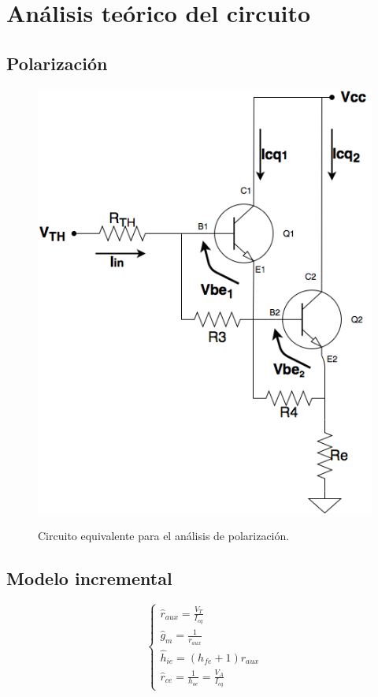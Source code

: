 \section{An\'alisis te\'orico del circuito}

	\subsection{Polarizaci\'on}
		
		\begin{figure}[H]
			\centering
			\includegraphics[scale=0.4]{../polarizacion.png} \\
			\caption{Circuito equivalente para el an\'alisis de polarizaci\'on.}
			\label{polarizacion}
		\end{figure}

	\subsection{Modelo incremental}
	
		\begin{equation}
			\begin{cases}
			\widehat{r}_{aux} = \frac{V_T}{I_{cq}}\\
			\widehat{g}_m = \frac{1}{r_{aux}}\\	
			\widehat{h}_{ie} = (h_{fe} + 1) r_{aux}\\
			\widehat{r}_{ce} = \frac{1}{h_{oe}} = \frac{V_A}{I_{cq}}
			\end{cases}
			\label{mod_inc_ecs}
		\end{equation}
	
